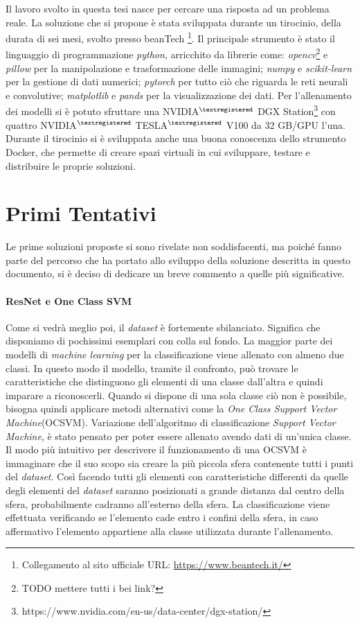 Il lavoro svolto in questa tesi nasce per cercare una risposta ad un problema reale.
La soluzione che si propone è stata sviluppata durante un tirocinio, della durata di sei mesi, svolto presso beanTech \footnote{Collegamento al sito ufficiale URL: \url{https://www.beantech.it/}}.
Il principale strumento è stato il linguaggio di programmazione \textit{python}, arricchito da librerie come:
\textit{opencv}\footnote{TODO mettere tutti i bei link?} e \textit{pillow} per la manipolazione e trasformazione delle immagini; 
\textit{numpy} e \textit{scikit-learn} per la gestione di dati numerici;
\textit{pytorch} per tutto ciò che riguarda le reti neurali e convolutive;
\textit{matplotlib} e \textit{pands} per la visualizzazione dei dati.
Per l'allenamento dei modelli si è potuto sfruttare una NVIDIA$^{\tiny{\textregistered}}$ DGX Station\footnote{https://www.nvidia.com/en-us/data-center/dgx-station/} con quattro NVIDIA$^{\tiny{\textregistered}}$ TESLA$^{\tiny{\textregistered}}$ V100 da 32 GB/GPU l'una.
Durante il tirocinio si è sviluppata anche una buona conoscenza dello strumento Docker, che permette di creare spazi virtuali in cui sviluppare, testare e distribuire le proprie soluzioni.

\section{Primi Tentativi}
Le prime soluzioni proposte si sono rivelate non soddisfacenti, ma poiché fanno parte del percorso che ha portato allo sviluppo della soluzione descritta in questo documento, si è deciso di dedicare un breve commento a quelle più significative.

\paragraph{ResNet e One Class SVM}
Come si vedrà meglio poi, il \textit{dataset} è fortemente sbilanciato.
Significa che disponiamo di pochissimi esemplari con colla sul fondo.
La maggior parte dei modelli di \textit{machine learning} per la classificazione viene allenato con almeno due classi.
In questo modo il modello, tramite il confronto, può trovare le caratteristiche che distinguono gli elementi di una classe dall'altra e quindi imparare a riconoscerli.
Quando si dispone di una sola classe ciò non è possibile, bisogna quindi applicare metodi alternativi come la \textit{One Class Support Vector Machine}(OCSVM).
Variazione dell'algoritmo di classificazione \textit{Support Vector Machine}, è stato pensato per poter essere allenato avendo dati di un'unica classe.
Il modo più intuitivo per descrivere il funzionamento di una OCSVM è immaginare che il suo scopo sia creare la più piccola sfera contenente tutti i punti del \textit{dataset}.
Così facendo tutti gli elementi con caratteristiche differenti da quelle degli elementi del \textit{dataset} saranno posizionati a grande distanza dal centro della sfera, probabilmente cadranno all'esterno della sfera.
La classificazione viene effettuata verificando se l'elemento cade entro i confini della sfera, in caso affermativo l'elemento appartiene alla classe utilizzata durante l'allenamento.

